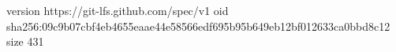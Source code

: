 version https://git-lfs.github.com/spec/v1
oid sha256:09c9b07cbf4eb4655eaae44e58566edf695b95b649eb12bf012633ca0bbd8c12
size 431
